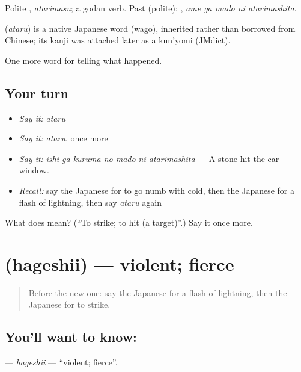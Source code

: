 Polite \textbf{}, \emph{atarimasu}; a godan verb. Past (polite): \textbf{  }, \emph{ame ga mado ni atarimashita}.

\begin{cousinweb}
\textbf{} (\emph{ataru}) is a native Japanese word (wago), inherited rather than borrowed from Chinese; its kanji was attached later as a kun'yomi (JMdict).
\end{cousinweb}

\begin{grammarlens}[title={What you've built}]
One more word for telling what happened.
\end{grammarlens}

\subsection*{Your turn}
\begin{itemize}
\raggedright
  \item \emph{Say it:} \emph{ataru}
  \item \emph{Say it:} \emph{ataru}, once more
  \item \emph{Say it:} \emph{ishi ga kuruma no mado ni atarimashita} — A stone hit the car window.
  \item \emph{Recall:} say the Japanese for to go numb with cold, then the Japanese for a flash of lightning, then say \emph{ataru} again
\end{itemize}

\begin{tcolorbox}[breakable,colback=teal!4,colframe=teal!35!black,title={Before you move on}]
What does  mean? (\textquotedblleft{}To strike; to hit (a target)\textquotedblright{}.) Say it once more.
\end{tcolorbox}
\section[\texorpdfstring{\ja{はげしい} (hageshii)}{はげしい (hageshii)}]{ (hageshii) — violent; fierce}

\label{lesson:JA-C278-hageshii}



\begin{quote}
Before the new one: say the Japanese for a flash of lightning, then the Japanese for to strike.
\end{quote}

\subsection*{You'll want to know: }
\textbf{} — \emph{hageshii} — \textquotedblleft{}violent; fierce\textquotedblright{}.

